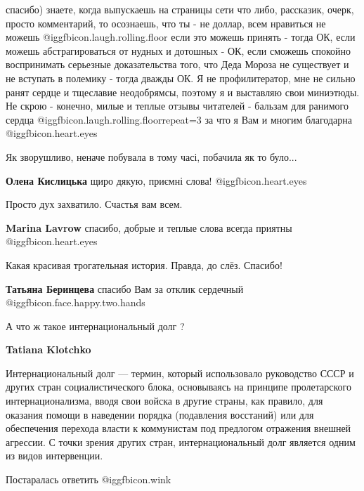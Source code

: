\begin{itemize}
\begin{itemize}
спасибо) знаете, когда выпускаешь на страницы сети что либо, рассказик, очерк,
просто комментарий, то осознаешь, что ты - не доллар, всем нравиться не
можешь @igg{fbicon.laugh.rolling.floor}  если это можешь принять - тогда ОК, если можешь абстрагироваться от
нудных и дотошных - ОК, если сможешь спокойно воспринимать серьезные
доказательства того, что Деда Мороза не существует и не вступать в полемику -
тогда дважды ОК. Я не профилитератор, мне не сильно ранят сердце и тщеславие
неодобрямсы, поэтому я и выставляю свои миниэтюды. Не скрою - конечно, милые и
теплые отзывы читателей - бальзам для ранимого сердца @igg{fbicon.laugh.rolling.floor}{repeat=3} за что я Вам и
многим благодарна @igg{fbicon.heart.eyes} 

\end{itemize} %

Як зворушливо, неначе побувала в тому часі, побачила як то було...

\textbf{Олена Кислицька} щиро дякую, приємні слова! @igg{fbicon.heart.eyes} 

Просто дух захватило. Счастья вам всем.

\textbf{Marina Lavrow} спасибо, добрые и теплые слова всегда приятны @igg{fbicon.heart.eyes} 

Какая красивая трогательная история. Правда, до слёз. Спасибо!

\begin{itemize} %
\textbf{Татьяна Беринцева} спасибо Вам за отклик сердечный @igg{fbicon.face.happy.two.hands} 
\end{itemize} %

А что ж такое интернациональный долг ?

\begin{itemize} %
\textbf{Tatiana Klotchko} 

Интернациональный долг — термин, который использовало руководство СССР и других
стран социалистического блока, основываясь на принципе пролетарского
интернационализма, вводя свои войска в другие страны, как правило, для оказания
помощи в наведении порядка (подавления восстаний) или для обеспечения перехода
власти к коммунистам под предлогом отражения внешней агрессии. С точки зрения
других стран, интернациональный долг является одним из видов интервенции.

Постаралась ответить @igg{fbicon.wink} 


\end{itemize}
\end{itemize}
